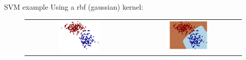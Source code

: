 \begin{frame}{SVM example}
Using a rbf (gaussian) kernel:
\begin{figure}
\begin{tabular}{cc}
\includegraphics[width=0.4\textwidth]{img/svm/rbf_kernel_11.pdf}&
\includegraphics[width=0.4\textwidth]{img/svm/rbf_kernel_12.pdf}
\end{tabular}
\end{figure}
\end{frame}